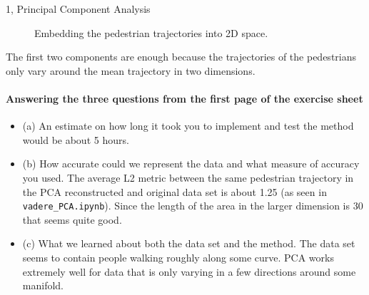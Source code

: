 \begin{task}{1, Principal Component Analysis}
\begin{figure}[H]
    \centering
    \caption{Embedding the pedestrian trajectories into 2D space.}
    \label{fig:pedestrianembed}
\end{figure}

The first two components are enough because the trajectories of the pedestrians only vary around the mean trajectory in two dimensions.

\paragraph{Answering the three questions from the first page of the exercise sheet}
\begin{itemize}
    \item (a) An estimate on how long it took you to implement and test the method would be about 5 hours.
    \item (b) How accurate could we represent the data and what measure of accuracy you used.
    The average L2 metric between the same pedestrian trajectory in the PCA reconstructed and original data set is about 1.25 (as seen in \verb+vadere_PCA.ipynb+). Since the length of the area in the larger dimension is 30 that seems quite good.
    \item (c) What we learned about both the data set and the method. 
    The data set seems to contain people walking roughly along some curve. PCA works extremely well for data that is only varying in a few directions around some manifold.
\end{itemize}

\end{task}